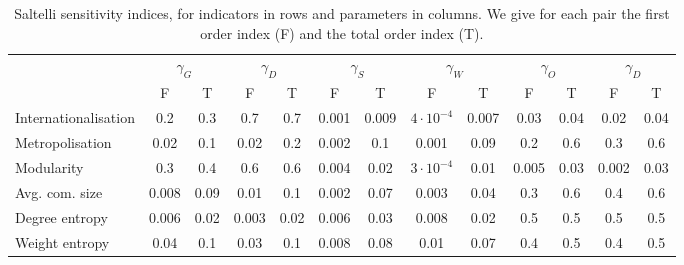 \begin{table}[h!]
\begin{adjustwidth}{-2.25in}{0in}
\caption{Saltelli sensitivity indices, for indicators in rows and parameters in columns. We give for each pair the first order index (F) and the total order index (T).\label{tab:saltelli}}
\hspace{-1cm}\begin{tabular}{|l|c|c|c|c|c|c|c|c|c|c|c|c|}
\hline
 & \multicolumn{2}{|c|}{$\gamma_G$} & \multicolumn{2}{|c|}{$\gamma_D$} & \multicolumn{2}{|c|}{$\gamma_S$} & \multicolumn{2}{|c|}{$\gamma_W$} & \multicolumn{2}{|c|}{$\gamma_O$} & \multicolumn{2}{|c|}{$\gamma_D$} \\
 & F & T & F & T & F & T & F & T & F & T & F & T \\
 \hline
Internationalisation & 0.2 & 0.3 & 0.7 & 0.7 & 0.001 & 0.009 & $4\cdot 10^{-4}$ & 0.007 & 0.03 & 0.04 & 0.02 & 0.04 \\
Metropolisation & 0.02 & 0.1 & 0.02 & 0.2 & 0.002 & 0.1 & 0.001 & 0.09 & 0.2 & 0.6 & 0.3 & 0.6 \\
Modularity & 0.3 & 0.4 & 0.6 & 0.6 & 0.004 & 0.02 & $3\cdot 10^{-4}$ & 0.01 & 0.005 & 0.03 & 0.002 & 0.03 \\
Avg. com. size & 0.008 & 0.09 & 0.01 & 0.1 & 0.002 & 0.07 & 0.003 & 0.04 & 0.3 & 0.6 & 0.4 & 0.6 \\
Degree entropy & 0.006 & 0.02 & 0.003 & 0.02 & 0.006 & 0.03 & 0.008 & 0.02 & 0.5 & 0.5 & 0.5 & 0.5 \\
Weight entropy & 0.04 & 0.1 & 0.03 & 0.1 & 0.008 & 0.08 & 0.01 & 0.07 & 0.4 & 0.5 & 0.4 & 0.5 \\\hline
\end{tabular}
\end{adjustwidth}
\end{table}





